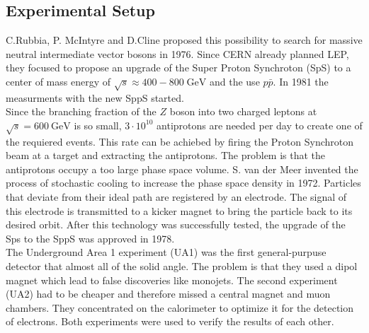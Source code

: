 \subsection{Experimental Setup}
C.Rubbia, P. McIntyre and D.Cline proposed this possibility to search for massive neutral intermediate vector bosons in 1976. Since CERN already planned LEP, they focused to propose an upgrade of the Super Proton Synchroton (SpS) to a center of mass energy of $\sqrt{s} \approx 400-800 \;\si{\GeV}$ and the use $p\bar{p}$. In 1981 the measurments with the new SppS started.\\
Since the branching fraction of the $Z$ boson into two charged leptons at $\sqrt{s}=\SI{600}{\giga\electronvolt}$ is so small, $3\cdot10^{10}$ antiprotons are needed per day to create one of the requiered events. This rate can be achiebed by firing the Proton Synchroton beam at a target and extracting the antiprotons. The problem is that the antiprotons occupy a too large phase space volume. S. van der Meer invented the process of stochastic cooling to increase the phase space density in 1972. Particles that deviate from their ideal path are registered by an electrode. The signal of this electrode is transmitted to a kicker magnet to bring the particle back to its desired orbit. After this technology was successfully tested, the upgrade of the Sps to the SppS was approved in 1978.\\
The Underground Area 1 experiment (UA1) was the first general-purpuse detector that almost all of the solid angle. The problem is that they used a dipol magnet which lead to false discoveries like monojets. The second experiment (UA2) had to be cheaper and therefore missed a central magnet and muon chambers. They concentrated on the calorimeter to optimize it for the detection of electrons. Both experiments were used to verify the results of each other.

